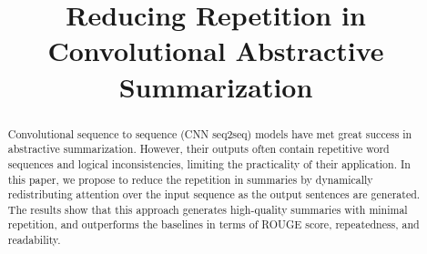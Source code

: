 \documentclass[11pt]{article}
\title{Reducing Repetition in Convolutional Abstractive Summarization}
\date{}
\theoremstyle{definition}
\begin{document}
\maketitle
\begin{abstract}
Convolutional sequence to sequence (CNN seq2seq) models
have met great success in abstractive summarization. 
However, their outputs often contain repetitive word sequences and logical
inconsistencies, limiting the practicality of their application.
In this paper, we propose to reduce the repetition in summaries
by dynamically redistributing attention over the input sequence as
the output sentences are generated.
The results show that this approach 
generates high-quality summaries with minimal repetition, 
and outperforms the baselines 
in terms of
ROUGE score, repeatedness, and readability.
\end{abstract}

\maketitle








\end{document}
